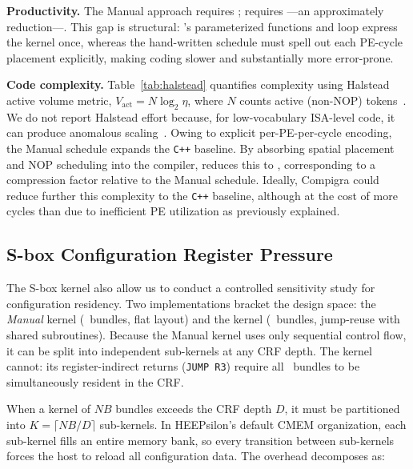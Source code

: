 \textbf{Productivity.}
The Manual approach requires \lines{\MetricLocManual}; \castm{} requires \lines{\MetricLocCastm}---an approximately \timex{\MetricLocCompressionVsManual} reduction---.
This gap is structural: \castm{}'s parameterized functions and loop express the kernel once, whereas the hand-written schedule must spell out each PE-cycle placement explicitly, making coding slower and substantially more error-prone.

\textbf{Code complexity.}
Table~\ref{tab:halstead} quantifies complexity using Halstead active volume metric, $V_{\text{act}} = N \log_2 \eta$, where $N$ counts active (non-NOP) tokens~\cite{halstead1977}. We do not report Halstead effort because, for low-vocabulary ISA-level code, it can produce anomalous scaling~\cite{sinha2011}. Owing to explicit per-PE-per-cycle encoding, the Manual schedule expands \timex{\MetricHalsteadManualRatio} the \texttt{C++} baseline. By absorbing spatial placement and NOP scheduling into the compiler, \castm{} reduces this to \timex{\MetricHalsteadCastmRatio}, corresponding to a \timex{\MetricHalsteadCompressionVsManual} compression factor relative to the Manual schedule. Ideally, Compigra could reduce further this complexity to \timex{\MetricHalsteadCompigraRatio} the \texttt{C++} baseline, although at the cost of \timex{\MetricSboxCompigraSlowdownVsCastm} more cycles than \castm{} due to inefficient PE utilization as previously explained.



\subsection{S-box Configuration Register Pressure}
\label{subsec:creg-analysis}

The S-box kernel also allow us to conduct a controlled sensitivity study for configuration residency. Two implementations bracket the design space: the \emph{Manual} kernel (\MetricSboxManualNB~bundles, flat layout) and the \emph{\castm{}} kernel (\MetricSboxCastmNB~bundles, jump-reuse with shared subroutines). Because the Manual kernel uses only sequential control flow, it can be split into independent sub-kernels at any CRF depth. The \castm{} kernel cannot: its register-indirect returns (\texttt{JUMP~R3}) require all \MetricSboxKernelResidentBundles~bundles to be simultaneously resident in the CRF.

When a kernel of $NB$ bundles exceeds the CRF depth $D$, it must be partitioned into $K = \lceil NB/D \rceil$ sub-kernels. In HEEPsilon's default CMEM organization, each sub-kernel fills an entire memory bank, so every transition between sub-kernels forces the host to reload all configuration data. The overhead decomposes as:

